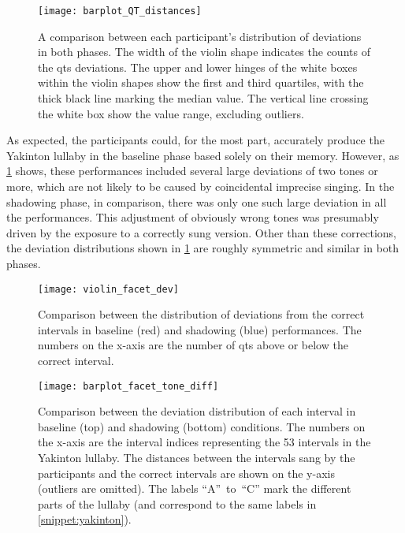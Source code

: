 \begin{figure}[t!]
	\centering
	\texttt{[image: barplot\_QT\_distances]}
	\caption[Comparison of participants' singing deviations distributions]
		{A comparison between each participant's distribution of deviations in both phases.
		 The width of the violin shape indicates the counts of the \acsp{qt} deviations.
		 The upper and lower hinges of the white boxes within the violin shapes show the first and third quartiles, with the thick black line marking the median value.
		 The vertical line crossing the white box show the value range, excluding outliers.}
	\label{fig:barplot_QT_distances}
\end{figure}
%
As expected, the participants could, for the most part, accurately produce the Yakinton lullaby in the baseline phase based solely on their memory.
However, as \cref{fig:barplot_QT_distances} shows, these performances included several large deviations of two tones or more, which are not likely to be caused by coincidental imprecise singing.
In the shadowing phase, in comparison, there was only one such large deviation in all the performances.
This adjustment of obviously wrong tones was presumably driven by the exposure to a correctly sung version.
Other than these corrections, the deviation distributions shown in \cref{fig:barplot_QT_distances} are roughly symmetric and similar in both phases.
%
\begin{figure}[t!]
	\centering
	\texttt{[image: violin\_facet\_dev]}
	\caption[Summary of within-participant interval deviation distribution]
	{Comparison between the distribution of deviations from the correct intervals in baseline (red) and shadowing (blue) performances.
		The numbers on the x-axis are the number of \acp{qt} above or below the correct interval.}
	\label{fig:violin_facet_dev}
\end{figure}
%
\begin{figure}[t]
	\centering
	\texttt{[image: barplot\_facet\_tone\_diff]}
	\caption[Interval deviations in baseline and shadowing performances]
	{Comparison between the deviation distribution of each interval in baseline (top) and shadowing (bottom) conditions.
		The numbers on the x-axis are the interval indices representing the 53 intervals in the Yakinton lullaby.
		The distances between the intervals sang by the participants and the correct intervals are shown on the y-axis (outliers are omitted).
		The labels \enquote{A}~to~\enquote{C} mark the different parts of the lullaby (and correspond to the same labels in \cref{snippet:yakinton}).}
	\label{fig:barplot_facet_tone_diff}
\end{figure}
